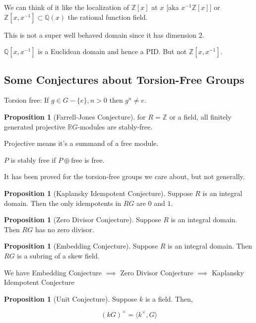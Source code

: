 \documentclass{article}
\theoremstyle{definition}
\newtheorem{proposition}[theorem]{Proposition}
\begin{document}
We can think of it like the localization of \(\mathbb{Z} [x]\) at \(x\) [aka \(x ^{-1} \mathbb{Z} [x]\)] or \(\mathbb{Z} [x, x ^{-1}] \subset \mathbb{Q} (x)\) the rational function field.

This is not a super well behaved domain since it has dimension \(2\).

\(\mathbb{Q} [x,x ^{-1}]\) is a Euclidean domain and hence a PID. But not \(\mathbb{Z} [x, x ^{-1}]\).

\subsection*{Some Conjectures about Torsion-Free Groups}

Torsion free: If \(g \in G - \{ e \}, n > 0\) then \(g^n \neq e\).

\begin{proposition}
    [Farrell-Jones Conjecture] for \(R = \mathbb{Z}\) or a field, all finitely generated projective \(\mathbb{R} G\)-modules are stably-free.
\end{proposition}

Projective means it's a summand of a free module.

\(P\) is stably free if \(P \oplus \text{free}\) is free.

It has been proved for the torsion-free groups we care about, but not generally.

\begin{proposition}
    [Kaplansky Idempotent Conjecture]

    Suppose \(R\) is an integral domain. Then the only idempotents in \(RG\) are \(0\) and \(1\).
\end{proposition}

\begin{proposition}
    [Zero Divisor Conjecture] Suppose \(R\) is an integral domain. Then \(RG\) has no zero divisor.
\end{proposition}

\begin{proposition}
    [Embedding Conjecture] Suppose \(R\) is an integral domain. Then \(RG\) is a subring of a skew field.
\end{proposition}

We have Embedding Conjecture \(\implies\) Zero Divisor Conjecture \(\implies\) Kaplansky Idempotent Conjecture

\begin{proposition}
    [Unit Conjecture]

    Suppose \(k\) is a field. Then,

    \[
        (kG)^\times = \langle k^\times, G \rangle 
    \]
\end{proposition}
\end{document}
